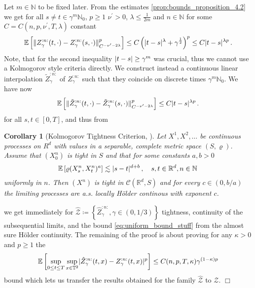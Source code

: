 \documentclass{report}
\newcommand{\NN}{\mathbb{N}}
\newcommand{\NO}{{\mathbb{N}_0}}
\newcommand{\RR}{\mathbb{R}}
\newcommand{\TT}{\mathbb{T}}
\DeclarePairedDelimiter\abs{\lvert}{\rvert} %
\DeclarePairedDelimiter\norm{\lVert}{\rVert}%
\newcommand{\Exp}[1]{\mathbb{E}\left[#1\right]}
\DeclareMathOperator{\DefiningEquality}{\coloneqq}
\newtheorem{corollary}{Corollary}[theorem]
\renewenvironment{proof}{{\bf \emph{Proof (idea):} }}{\hfill $\Box$ \\}
\theoremstyle{remark}
\theoremstyle{definition}
\let\rho\varrho
\begin{document}
\begin{proof}
  Let $m\in\NN$ to be fixed later. From the estimates \autoref{prop:bounds_proposition_4.2} we get for all $s \neq t \in \gamma^m \NO$, $p\ge 1$ $\nu^\prime > 0$, $\lambda \le \frac{1}{2m}$ and $n \in \NN$ for some $C = C(n, p, \nu^\prime, T, \lambda)$ constant 
  \begin{align}
    \label{eq:almost_kolmogorov_criteria}
    \Exp{\norm{Z^{:n:}_\gamma(t, \cdot) - Z^{:n:}_\gamma(s, \cdot)}^p_{C^{-\nu^\prime - 2\lambda}}} \le C \left(\abs{t - s}^\lambda + \gamma^{\frac{1}{2}}\right)^p \le C \abs{t - s}^{\lambda p}\,.
  \end{align}
  Note, that for the second inequality $\abs{t - s} \ge \gamma^m$ was crucial, thus we cannot use a Kolmogorov style criteria directly. We construct instead a continuous linear interpolation $\tilde{Z}^{:n:}_\gamma$ of $Z^{:n:}_\gamma$ such that they coincide on discrete times $\gamma^m \NO$. We have now
  \begin{align}
    \Exp{\norm{\tilde{Z}^{:n:}_\gamma(t, \cdot) - \tilde{Z}^{:n:}_\gamma(s, \cdot)}^p_{C^{-\nu^\prime - 2\lambda}}} \le C \abs{t - s}^{\lambda p}\,.    
  \end{align}
  for all $s, t \in [0, T]$, and thus from
  \begin{corollary}[Kolmogorov Tightness Criterion, {\cite[Corollary 14.9]{kallenberg2013foundations}}]
    Let $X^1, X^2, \ldots$ be continuous processes on $R^d$ with values in a separable, complete metric space $(S, \rho)$. Assume that $(X_0^n)$ is tight in $S$ and that for some constants $a, b > 0$
    \begin{align*}
      \Exp{\rho(X^n_s, X^n_t)^a} \lesssim \abs{s - t}^{d + b}\,, \quad s, t \in \RR^d, n \in \NN\,
    \end{align*}
    uniformly in $n$. Then $(X^n)$ is tight in $\mathcal{C}(\RR^d, S)$ and for every $c \in (0, b/a)$ the limiting processes are a.s. locally Hölder continous with exponent $c$.
  \end{corollary}
  we get immediately for $\hat{\mathcal{Z}} \DefiningEquality \left\{\hat{Z}^{:n:}_{\gamma}, \gamma \in (0, 1/3)\right\}$ tightness, continuity of the subsequential limits, and the bound \eqref{eq:uniform_bound_stuff} from the almost sure Hölder continuity. The remaining of the proof is about proving for any $\kappa > 0$ and $p\ge1$ the
  \begin{align*}
    \Exp{\sup_{0 \le t \le T} \sup_{x \in \TT^2} \abs{ \hat{Z}^{:n:}_\gamma(t, x) - Z^{:n:}_\gamma(t, x)}^p} \le C(n, p, T, \kappa) \gamma^{(1 - \kappa) p}
  \end{align*}
  bound which lets us transfer the results obtained for the family $\hat{\mathcal{Z}}$ to $\mathcal{Z}$.
\end{proof}
\end{document}
